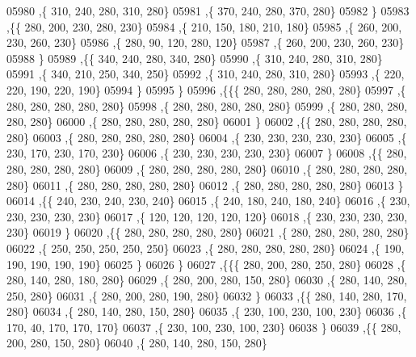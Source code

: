 \begin{DoxyCode}
05980     ,\{   310,   240,   280,   310,   280\}
05981     ,\{   370,   240,   280,   370,   280\}
05982     \}
05983    ,\{\{   280,   200,   230,   280,   230\}
05984     ,\{   210,   150,   180,   210,   180\}
05985     ,\{   260,   200,   230,   260,   230\}
05986     ,\{   280,    90,   120,   280,   120\}
05987     ,\{   260,   200,   230,   260,   230\}
05988     \}
05989    ,\{\{   340,   240,   280,   340,   280\}
05990     ,\{   310,   240,   280,   310,   280\}
05991     ,\{   340,   210,   250,   340,   250\}
05992     ,\{   310,   240,   280,   310,   280\}
05993     ,\{   220,   220,   190,   220,   190\}
05994     \}
05995    \}
05996   ,\{\{\{   280,   280,   280,   280,   280\}
05997     ,\{   280,   280,   280,   280,   280\}
05998     ,\{   280,   280,   280,   280,   280\}
05999     ,\{   280,   280,   280,   280,   280\}
06000     ,\{   280,   280,   280,   280,   280\}
06001     \}
06002    ,\{\{   280,   280,   280,   280,   280\}
06003     ,\{   280,   280,   280,   280,   280\}
06004     ,\{   230,   230,   230,   230,   230\}
06005     ,\{   230,   170,   230,   170,   230\}
06006     ,\{   230,   230,   230,   230,   230\}
06007     \}
06008    ,\{\{   280,   280,   280,   280,   280\}
06009     ,\{   280,   280,   280,   280,   280\}
06010     ,\{   280,   280,   280,   280,   280\}
06011     ,\{   280,   280,   280,   280,   280\}
06012     ,\{   280,   280,   280,   280,   280\}
06013     \}
06014    ,\{\{   240,   230,   240,   230,   240\}
06015     ,\{   240,   180,   240,   180,   240\}
06016     ,\{   230,   230,   230,   230,   230\}
06017     ,\{   120,   120,   120,   120,   120\}
06018     ,\{   230,   230,   230,   230,   230\}
06019     \}
06020    ,\{\{   280,   280,   280,   280,   280\}
06021     ,\{   280,   280,   280,   280,   280\}
06022     ,\{   250,   250,   250,   250,   250\}
06023     ,\{   280,   280,   280,   280,   280\}
06024     ,\{   190,   190,   190,   190,   190\}
06025     \}
06026    \}
06027   ,\{\{\{   280,   200,   280,   250,   280\}
06028     ,\{   280,   140,   280,   180,   280\}
06029     ,\{   280,   200,   280,   150,   280\}
06030     ,\{   280,   140,   280,   250,   280\}
06031     ,\{   280,   200,   280,   190,   280\}
06032     \}
06033    ,\{\{   280,   140,   280,   170,   280\}
06034     ,\{   280,   140,   280,   150,   280\}
06035     ,\{   230,   100,   230,   100,   230\}
06036     ,\{   170,    40,   170,   170,   170\}
06037     ,\{   230,   100,   230,   100,   230\}
06038     \}
06039    ,\{\{   280,   200,   280,   150,   280\}
06040     ,\{   280,   140,   280,   150,   280\}

\end{DoxyCode}
